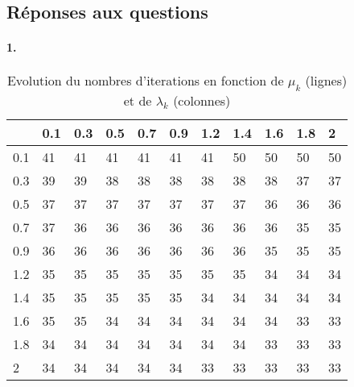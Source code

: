 \documentclass[12pt]{article}
\begin{document}
\subsection{Réponses aux questions}
\paragraph{1.}

\begin{table}[]
\centering
\caption{Evolution du nombres d'iterations en fonction de $\mu_k$ (lignes) et de $\lambda_k$ (colonnes)}
\begin{tabular}{l|llllllllll}
\cline{2-11}
 & \multicolumn{1}{l|}{0.1} & \multicolumn{1}{l|}{0.3} & \multicolumn{1}{l|}{0.5} & \multicolumn{1}{l|}{0.7} & \multicolumn{1}{l|}{0.9} & \multicolumn{1}{l|}{1.2} & \multicolumn{1}{l|}{1.4} & \multicolumn{1}{l|}{1.6} & \multicolumn{1}{l|}{1.8} & \multicolumn{1}{l|}{2} \\ \hline
\multicolumn{1}{|l|}{0.1} &41  &  41  &  41  &  41  &  41  &  41   & 50  &  50 &   50  &  50  \\ \cline{1-1}
\multicolumn{1}{|l|}{0.3} &39  &  39  &  38  &  38  &  38  &  38  &  38  &  38  &  37 &   37  \\ \cline{1-1}
\multicolumn{1}{|l|}{0.5} &37   & 37  &  37  &  37 &   37  &  37  &  37  &  36  &  36  &  36  \\ \cline{1-1}
\multicolumn{1}{|l|}{0.7} &37  &  36  &  36  &  36 &   36  &  36  &  36  &  36 &   35  &  35 \\ \cline{1-1}
\multicolumn{1}{|l|}{0.9} &36  &  36  &  36  &  36 &   36  &  36  &  36  &  35 &   35  &  35 \\ \cline{1-1}
\multicolumn{1}{|l|}{1.2} &35  &  35  &  35  &  35 &   35  &  35  &  35  &  34 &   34  &  34 \\ \cline{1-1}
\multicolumn{1}{|l|}{1.4} &35  &  35  &  35  &  35 &   35  &  34  &  34  &  34 &   34  &  34 \\ \cline{1-1}
\multicolumn{1}{|l|}{1.6} &35  &  35  &  34  &  34 &   34  &  34  &  34  &  34 &   33  &  33 \\ \cline{1-1}
\multicolumn{1}{|l|}{1.8} &34  &  34  &  34  &  34 &   34  &  34  &  34  &  33 &   33  &  33 \\ \cline{1-1}
\multicolumn{1}{|l|}{2} &34  &  34  &  34  &  34 &   34  &  33  &  33  &  33 &   33  &  33 \\ \cline{1-1}
\end{tabular}
\end{table}
\end{document}
